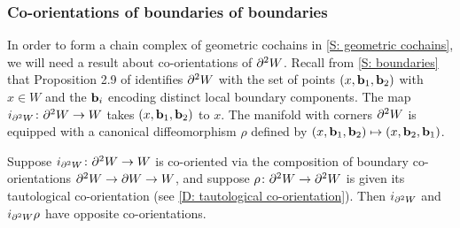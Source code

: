\begin{comment}
	\red{TO DO SOMEWHERE: It will be convenient to show that $g \colon W^0 \to M$ with this co-orientation is the pullback of $M^0 \into M$ (co-oriented as defined here) and $g \colon W \to M$ and similarly for $g \colon W^\pm \to M$.
		Also need to rewrite things in other places as $M^0$, $M^\pm$, etc instead of always writing $\varphi^{-1}((\infty,0])$ etc.
		Also need to show that $\bd W^0 = -(\bd W)^0$, which should follow from the Leibniz rule and the first thing the previous sentence.}
\end{comment}

\subsubsection{Co-orientations of boundaries of boundaries}

In order to form a chain complex of geometric cochains in \cref{S: geometric cochains}, we will need a result about co-orientations of $\partial^2 W$.
Recall from \cref{S: boundaries} that Proposition 2.9 of \cite{Joy12} identifies $\partial^2 W$ with the set of points $(x,\mathbf{b}_1,\mathbf{b}_2)$ with $x \in W$ and the $\mathbf{b}_i$ encoding distinct local boundary components.
The map $i_{\partial^2 W} \colon \partial^2 W \to W$ takes $(x,\mathbf{b}_1,\mathbf{b}_2)$ to $x$.
The manifold with corners $\partial^2 W$ is equipped with a canonical diffeomorphism $\rho$ defined by $(x,\mathbf{b}_1,\mathbf{b}_2) \mapsto (x,\mathbf{b}_2,\mathbf{b}_1)$.

\begin{lemma}\label{L: boundary2}
	Suppose $i_{\partial^2 W} \colon \partial^2 W \to W$ is co-oriented via the composition of boundary co-orientations $\partial^2 W \to \partial W \to W$, and suppose $\rho \colon \partial^2 W \to \partial^2 W$ is given its tautological co-orientation (see \cref{D: tautological co-orientation}).
	Then $i_{\partial^2 W}$ and $i_{\partial^2 W}\rho$ have opposite co-orientations.
\end{lemma}

